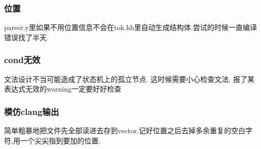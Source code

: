 \documentclass[11pt]{article}
\begin{document}
\subsubsection{位置}
\label{sec-2-3-1}
parser.y里如果不用位置信息不会在tok.hh里自动生成结构体.尝试的时候一直编译错误找了半天.
\subsubsection{cond无效}
\label{sec-2-3-2}
文法设计不当可能造成了状态机上的孤立节点. 这时候需要小心检查文法. 报了某表达式无效的warning一定要好好检查
\subsubsection{模仿clang输出}
\label{sec-2-3-3}
简单粗暴地把文件先全部读进去存到vector,记好位置之后去掉多余重复的空白字符,用一个尖尖指到要加的位置.
\end{document}
